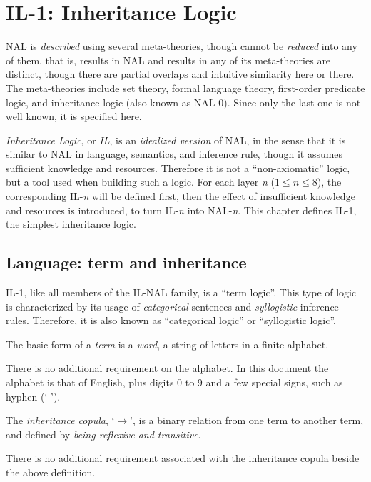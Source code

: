 \chapter{IL-1: Inheritance Logic}

NAL is \emph{described} using several meta-theories, though cannot be \emph{reduced} into any of them, that is, results in NAL and results in any of its meta-theories are distinct, though there are partial overlaps and intuitive similarity here or there. The meta-theories include set theory, formal language theory, first-order predicate logic, and inheritance logic (also known as NAL-0). Since only the last one is not well known, it is specified here.

\emph{Inheritance Logic}, or \emph{IL}, is an \emph{idealized version} of NAL, in the sense that it is similar to NAL in language, semantics, and inference rule, though it assumes sufficient knowledge and resources. Therefore it is not a ``non-axiomatic'' logic, but a tool used when building such a logic. For each layer \emph{n} (\(1 \le n \le 8\)), the corresponding IL-\emph{n} will be defined first, then the effect of insufficient knowledge and resources is introduced, to turn IL-\emph{n} into NAL-\emph{n}. This chapter defines IL-1, the simplest inheritance logic.


\section{Language: term and inheritance}

IL-1, like all members of the IL-NAL family, is a ``term logic''. This type of logic is characterized by its usage of \emph{categorical} sentences and \emph{syllogistic} inference rules.  Therefore, it is also known as ``categorical logic'' or ``syllogistic logic''.

\begin{defi}
The basic form of a {\em term} is a {\em word}, a string of letters in a finite alphabet.
\end{defi}
There is no additional requirement on the alphabet. In this document the alphabet is that of English, plus digits 0 to 9 and a few special signs, such as hyphen (`-').

\begin{defi}
The {\em inheritance copula}, `$\rightarrow$', is a binary relation from one term to another term, and defined by \emph{being reflexive and transitive}.
\end{defi}
There is no additional requirement associated with the inheritance copula beside the above definition.

